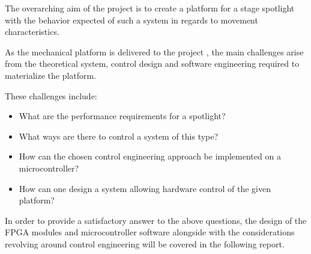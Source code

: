 \documentclass[../../main]{subfiles}
\begin{document}
The overarching aim of the project is to create a platform for a stage spotlight with the behavior expected of such a system in regards to movement characteristics.

As the mechanical platform is delivered to the project , the main challenges arise from the theoretical system, control design and software engineering required to materialize the platform.

These challenges include:

\begin{itemize}
    \item What are the performance requirements for a spotlight?
    \item What ways are there to control a system of this type? 
    \item How can the chosen control engineering approach be implemented on a microcontroller? 
    \item How can one design a system allowing hardware control of the given platform? 
\end{itemize}

In order to provide a satisfactory answer to the above questions, the design of the FPGA modules and microcontroller software alongside with the considerations revolving around control engineering will be covered in the following report. 
\end{document}
